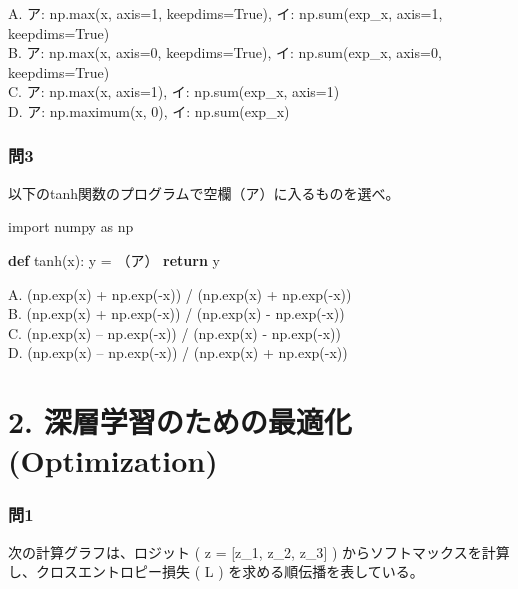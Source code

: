 \documentclass[
  letterpaper,
  DIV=11,
  numbers=noendperiod]{scrreprt}
\newenvironment{Shaded}{\begin{snugshade}}{\end{snugshade}}
\newcommand{\ControlFlowTok}[1]{\textcolor[rgb]{0.00,0.23,0.31}{\textbf{#1}}}
\newcommand{\ImportTok}[1]{\textcolor[rgb]{0.00,0.46,0.62}{#1}}
\newcommand{\KeywordTok}[1]{\textcolor[rgb]{0.00,0.23,0.31}{\textbf{#1}}}
\newcommand{\NormalTok}[1]{\textcolor[rgb]{0.00,0.23,0.31}{#1}}
\newcommand{\OperatorTok}[1]{\textcolor[rgb]{0.37,0.37,0.37}{#1}}
\begin{document}
A. ア: np.max(x, axis=1, keepdims=True), イ: np.sum(exp\_x, axis=1,
keepdims=True)\\
B. ア: np.max(x, axis=0, keepdims=True), イ: np.sum(exp\_x, axis=0,
keepdims=True)\\
C. ア: np.max(x, axis=1), イ: np.sum(exp\_x, axis=1)\\
D. ア: np.maximum(x, 0), イ: np.sum(exp\_x)

\subsection{問3}\label{ux554f3}

以下のtanh関数のプログラムで空欄（ア）に入るものを選べ。

\begin{Shaded}
\begin{Highlighting}[]
\ImportTok{import}\NormalTok{ numpy }\ImportTok{as}\NormalTok{ np}

\KeywordTok{def}\NormalTok{ tanh(x):}
\NormalTok{    y }\OperatorTok{=}\NormalTok{ （ア）}
    \ControlFlowTok{return}\NormalTok{ y}
\end{Highlighting}
\end{Shaded}

A. (np.exp(x) + np.exp(-x)) / (np.exp(x) + np.exp(-x))\\
B. (np.exp(x) + np.exp(-x)) / (np.exp(x) - np.exp(-x))\\
C. (np.exp(x) -- np.exp(-x)) / (np.exp(x) - np.exp(-x))\\
D. (np.exp(x) -- np.exp(-x)) / (np.exp(x) + np.exp(-x))

\chapter{2. 深層学習のための最適化
(Optimization)}\label{ux6df1ux5c64ux5b66ux7fd2ux306eux305fux3081ux306eux6700ux9069ux5316-optimization}

\subsection{問1}\label{ux554f1-1}

次の計算グラフは、ロジット ( z = {[}z\_1, z\_2, z\_3{]} )
からソフトマックスを計算し、クロスエントロピー損失 ( L )
を求める順伝播を表している。
\end{document}
